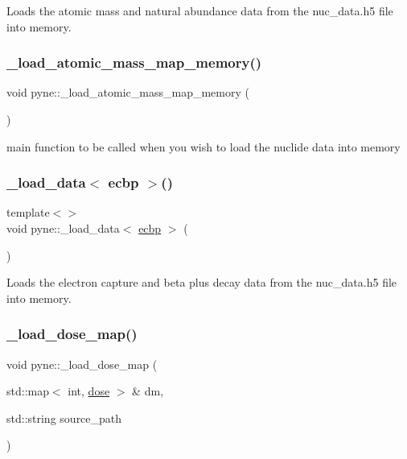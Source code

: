 Loads the atomic mass and natural abundance data from the nuc\+\_\+data.\+h5 file into memory. \mbox{\label{namespacepyne_a17db902268741d241fcc9d57ff7eef13}} 
\subsubsection{\texorpdfstring{\+\_\+load\+\_\+atomic\+\_\+mass\+\_\+map\+\_\+memory()}{\_load\_atomic\_mass\_map\_memory()}}
{\footnotesize\ttfamily void pyne\+::\+\_\+load\+\_\+atomic\+\_\+mass\+\_\+map\+\_\+memory (\begin{DoxyParamCaption}{ }\end{DoxyParamCaption})}

main function to be called when you wish to load the nuclide data into memory \mbox{\label{namespacepyne_aa0e5344b00be282952a8da5cc928b387}} 
\subsubsection{\texorpdfstring{\+\_\+load\+\_\+data$<$ ecbp $>$()}{\_load\_data< ecbp >()}}
{\footnotesize\ttfamily template$<$$>$ \\
void pyne\+::\+\_\+load\+\_\+data$<$ \hyperlink{structpyne_1_1ecbp}{ecbp} $>$ (\begin{DoxyParamCaption}{ }\end{DoxyParamCaption})}

Loads the electron capture and beta plus decay data from the nuc\+\_\+data.\+h5 file into memory. \mbox{\label{namespacepyne_a61b4594d84a994be8189442991abdd42}} 
\subsubsection{\texorpdfstring{\+\_\+load\+\_\+dose\+\_\+map()}{\_load\_dose\_map()}}
{\footnotesize\ttfamily void pyne\+::\+\_\+load\+\_\+dose\+\_\+map (\begin{DoxyParamCaption}\item[{std\+::map$<$ int, \hyperlink{structpyne_1_1dose}{dose} $>$ \&}]{dm,  }\item[{std\+::string}]{source\+\_\+path }\end{DoxyParamCaption})}

